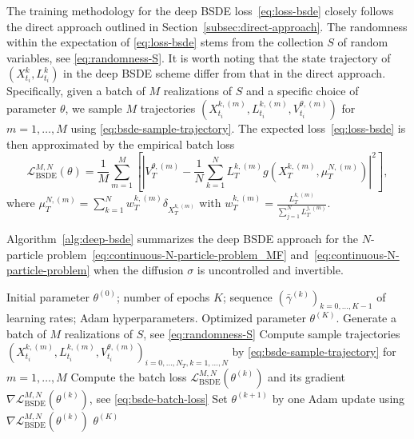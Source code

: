 \documentclass[11pt]{article}
\numberwithin{equation}{section}
\theoremstyle{plain}
\theoremstyle{definition}
\theoremstyle{remark}
\begin{document}
	The training methodology for the deep BSDE loss~\eqref{eq:loss-bsde} closely follows the direct approach outlined in Section~\ref{subsec:direct-approach}. The randomness within the expectation of \eqref{eq:loss-bsde} stems from the collection $S$ of random variables, see \eqref{eq:randomness-S}. It is worth noting that the state trajectory of $(X_{t_i}^k, L_{t_i}^k)$ in the deep BSDE scheme differ from that in the direct approach. Specifically, given a batch of $M$ realizations of $S$ and a specific choice of parameter $\theta$, we sample $M$ trajectories $(X_{t_i}^{k, (m)}, L_{t_i}^{k,(m)}, V_{t_i}^{\theta, (m)})$ for $m=1,\dots, M$ using \eqref{eq:bsde-sample-trajectory}. The expected loss~\eqref{eq:loss-bsde} is then approximated by the empirical batch loss 
	\begin{equation} \label{eq:bsde-batch-loss}
		\mathcal{L}^{M, N}_{\text{BSDE}}(\theta) = \frac{1}{M}\sum_{m=1}^M \left[ \left| V_{T}^{\theta, (m)} - \frac{1}{N}\sum_{k=1}^N L_T^{k,(m)} g(X_T^{k, (m)}, \mu_T^{N, (m)})\right|^2 \right], 
	\end{equation}
	where $\mu_T^{N,(m)} = \sum_{k=1}^N w_T^{k, (m)}\delta_{X_T^{k,(m)}}$ with $w_T^{k,(m)} = \frac{L_T^{k,(m)}}{\sum_{j=1}^N L_T^{j,(m)}}$. 
	
	Algorithm~\ref{alg:deep-bsde} summarizes the deep BSDE approach for the $N$-particle problem~\eqref{eq:continuous-N-particle-problem_MF} and~\eqref{eq:continuous-N-particle-problem} when the diffusion $\sigma$ is uncontrolled and invertible. 
	\begin{algorithm}[ht]
		\caption{Deep BSDE approach}
		\label{alg:deep-bsde}
		\begin{algorithmic}[1]
			\REQUIRE Initial parameter $\theta^{(0)}$; number of epochs $K$; sequence $(\bar{\gamma}^{(k)})_{k=0,\dots, K-1}$ of learning rates; Adam hyperparameters.
			\ENSURE Optimized parameter $\theta^{(K)}$. 
			\STATE Generate a batch of $M$ realizations of $S$, see \eqref{eq:randomness-S} 
			\STATE Compute sample trajectories $(X_{t_i}^{k, (m)}, L_{t_i}^{k,(m)}, V_{t_i}^{\theta, (m)})_{i=0, \dots, N_T, k=1,\dots, N}$ by \eqref{eq:bsde-sample-trajectory} for $m=1,\dots, M$ 
			\STATE Compute the batch loss $\mathcal{L}^{M, N}_{\text{BSDE}}(\theta^{(k)})$ and its gradient $\nabla \mathcal{L}^{M, N}_{\text{BSDE}}(\theta^{(k)})$, see \eqref{eq:bsde-batch-loss} 
			\STATE Set $\theta^{(k+1)}$ by one Adam update using $\nabla \mathcal{L}^{M, N}_{\text{BSDE}}(\theta^{(k)})$ 
			\ENDFOR
			\RETURN $\theta^{(K)}$   
		\end{algorithmic}
	\end{algorithm}
	
\end{document}
